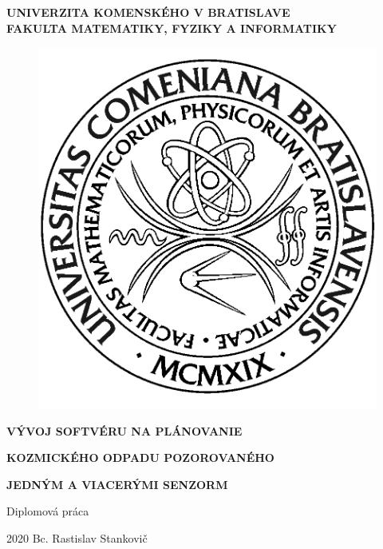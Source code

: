 \documentclass[12pt, a4paper, oneside]{book}
\newcommand\mfthesistype{Diplomová práca}
\newcommand\mfauthor{Bc. Rastislav Stankovič}
\newcommand\mfuniversity{UNIVERZITA KOMENSKÉHO V BRATISLAVE}
\newcommand\mffaculty{FAKULTA MATEMATIKY, FYZIKY A INFORMATIKY}
\begin{document}
\frontmatter

\thispagestyle{empty}

\noindent
\begin{minipage}{\textwidth}
\begin{center}
\textbf{\mfuniversity \\
\mffaculty}
\end{center}
\end{minipage}

\vfill
\begin{figure}[!hbt]
	\begin{center}
		\includegraphics{images/logo_fmph}
		\label{img:logo}
	\end{center}
\end{figure}
\begin{center}
	\begin{minipage}{0.8\textwidth}
		\centerline{\textbf{\Large\MakeUppercase{Vývoj softvéru na plánovanie}}}
		\centerline{\textbf{\Large\MakeUppercase{kozmického odpadu pozorovaného}}}
                      \centerline{\textbf{\Large\MakeUppercase{jedným a viacerými senzorm}}}
		\smallskip
		\centerline{\mfthesistype}
	\end{minipage}
\end{center}
\vfill
2020 \hfill
\mfauthor
\eject 
\end{document}
